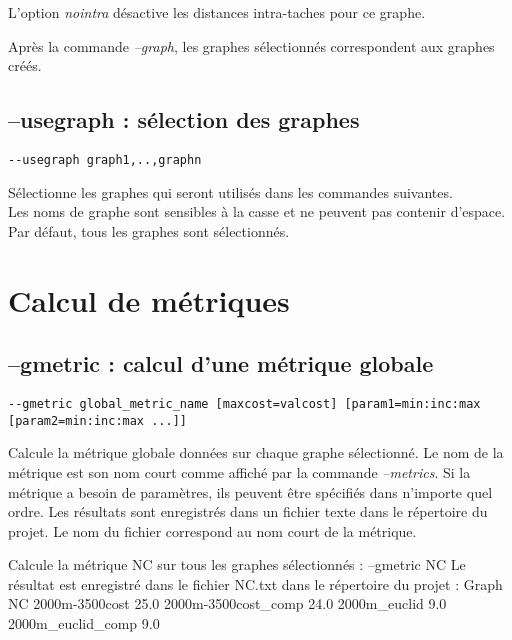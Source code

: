\documentclass[a4paper,10pt]{report}
\newenvironment{cmd}
{\quote\Verbatim}
{\endVerbatim\endquote}
\begin{document}
L'option \textit{nointra} désactive les distances intra-taches pour ce graphe.

Après la commande \textit{--graph}, les graphes sélectionnés correspondent aux graphes créés.

\subsection{--usegraph : sélection des graphes}
\begin{verbatim}
--usegraph graph1,..,graphn
\end{verbatim}
Sélectionne les graphes qui seront utilisés dans les commandes suivantes.\\
Les noms de graphe sont sensibles à la casse et ne peuvent pas contenir d'espace.\\
Par défaut, tous les graphes sont sélectionnés.

\section{Calcul de métriques}

\subsection{--gmetric : calcul d'une métrique globale}
\begin{verbatim}
--gmetric global_metric_name [maxcost=valcost] [param1=min:inc:max [param2=min:inc:max ...]]
\end{verbatim}
Calcule la métrique globale données sur chaque graphe sélectionné.
Le nom de la métrique est son nom court comme affiché par la commande \textit{--metrics}.
Si la métrique a besoin de paramètres, ils peuvent être spécifiés dans n'importe quel ordre.
Les résultats sont enregistrés dans un fichier texte dans le répertoire du projet. Le nom du fichier correspond au nom court de la métrique.

Calcule la métrique NC sur tous les graphes sélectionnés :
\begin{cmd}
--gmetric NC
\end{cmd}
Le résultat est enregistré dans le fichier NC.txt dans le répertoire du projet :
\begin{cmd}
Graph                NC
2000m-3500cost       25.0
2000m-3500cost_comp  24.0
2000m_euclid         9.0
2000m_euclid_comp    9.0
\end{cmd}
\end{document}

